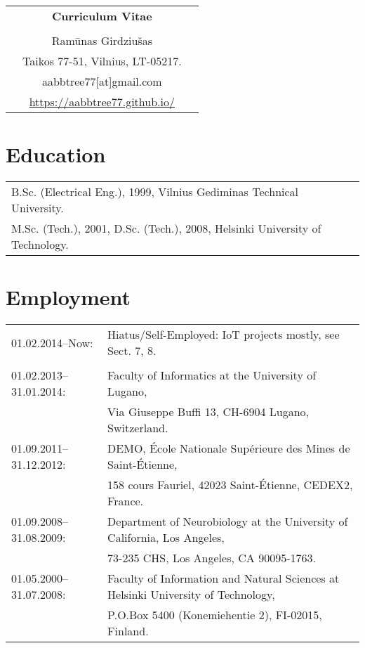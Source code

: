 \documentclass[a4paper,11pt]{article}
\begin{document}

%
%
\begin{center}
\begin{tabular}{ccc}
&\Large \textbf{Curriculum Vitae}&\\
\\
& Ram\={u}nas Girdziu\v{s}as &\\  
& Taikos 77-51, Vilnius, LT-05217. &\\
& aabbtree77[at]gmail.com &\\
& \url{https://aabbtree77.github.io/}
\end{tabular}
\end{center}
%
\section{Education}
%
\begin{tabular}{ll}
        B.Sc. (Electrical Eng.), 1999, Vilnius Gediminas Technical University.\\
        M.Sc. (Tech.), 2001, D.Sc. (Tech.), 2008, Helsinki University of Technology.
\end{tabular}
%
\section{Employment}
%
\begin{tabular}{ll}
01.02.2014--Now:        & Hiatus/Self-Employed: IoT projects mostly, see Sect. 7, 8.\\  
                        & \\
01.02.2013--31.01.2014: & Faculty of Informatics at the University of Lugano,\\
                        & Via Giuseppe Buffi 13, CH-6904 Lugano, Switzerland. 
\\
01.09.2011--31.12.2012: & DEMO, \'{E}cole Nationale Sup\'{e}rieure des Mines de Saint-\'{E}tienne,\\
&158 cours Fauriel, 42023 Saint-\'Etienne, CEDEX2, France.
\\
01.09.2008--31.08.2009: & Department of Neurobiology at the University of California, Los Angeles,\\
&73-235 CHS, Los Angeles, CA 90095-1763.
\\
01.05.2000--31.07.2008: & Faculty of Information and Natural Sciences at Helsinki University of Technology,\\ 
&  P.O.Box 5400 (Konemiehentie 2), FI-02015, Finland.
\end{tabular}
\end{document}
